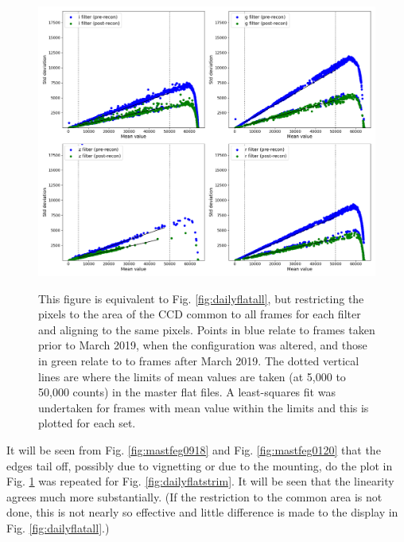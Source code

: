 \begin{figure}[!htbp]
\begin{center}
\includegraphics[scale=0.4]{images/dailyflatcomm.png}
\end{center}   
\caption{This figure is equivalent to Fig. \ref{fig:dailyflatall}, but
restricting the pixels to the area of the CCD common to all frames for each
filter and aligning to the same pixels. Points in blue relate to frames taken
prior to March 2019, when the configuration was altered, and those in green
relate to to frames after March 2019. The dotted vertical lines are where the
limits of mean values are taken (at 5,000 to 50,000 counts) in the master flat
files. A least-squares fit was undertaken for frames with mean value within the
limits and this is plotted for each set.}
\protect\label{fig:dailyflatscomm}
\end{figure}

It will be seen from Fig. \ref{fig:mastfeg0918} and Fig. \ref{fig:mastfeg0120}
that the edges tail off, possibly due to vignetting or due to the mounting, do
the plot in Fig. \ref{fig:dailyflatscomm} was repeated for Fig.
\ref{fig:dailyflatstrim}. It will be seen that the linearity agrees much more
substantially. (If the restriction to the common area is not done, this is not
nearly so effective and little difference is made to the display in Fig.
\ref{fig:dailyflatall}.)

